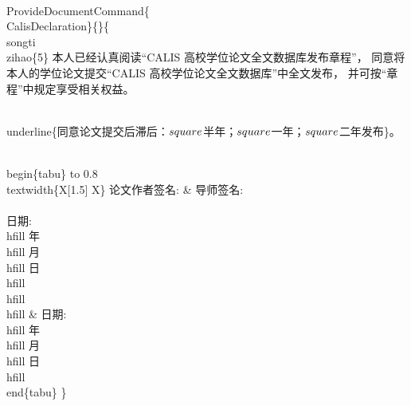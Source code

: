 \documentclass{hnuthesis}%
\begin{document}
\begin{nowebtrunk}
\nwenddocs{}\plusendmoddef\nwstartdeflinemarkup{}\nwenddeflinemarkup
\\ProvideDocumentCommand\{\\CalisDeclaration\}\{\}\{
\\songti\\zihao\{5\} 
本人已经认真阅读“CALIS 高校学位论文全文数据库发布章程”，
同意将本人的学位论文提交“CALIS 高校学位论文全文数据库”中全文发布，
并可按“章程”中规定享受相关权益。

\\underline\{同意论文提交后滞后：$\\square$半年；$\\square$一年；$\\square$二年发布\}。

\\begin\{tabu\} to 0.8\\textwidth\{X[1.5] X\}
论文作者签名: &  导师签名: \\\\
日期:\\hfill 年 \\hfill 月\\hfill 日\\hfill\\hfill\\hfill  & 
日期:\\hfill 年 \\hfill 月\\hfill 日\\hfill
\\end\{tabu\}
\}
\nwendcode{}\end{nowebtrunk}
\end{document}
